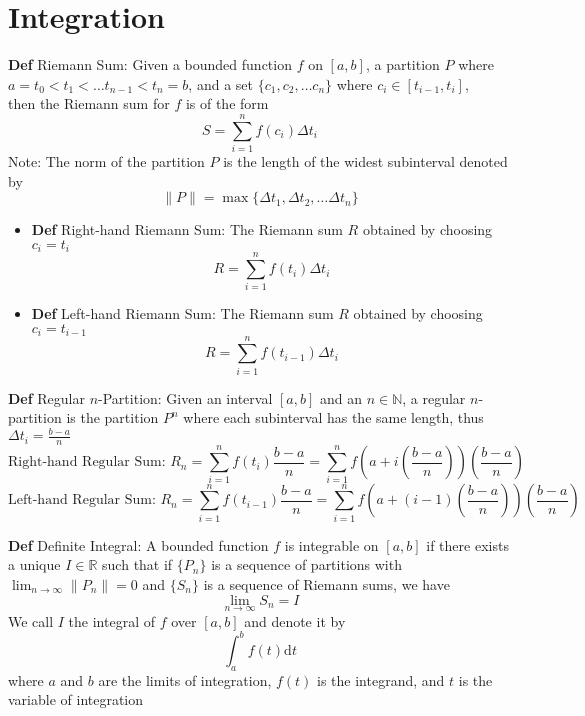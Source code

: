 \documentclass[11pt,notitlepage]{report}
\begin{document}
\newpage
{\small\tableofcontents}
\thispagestyle{empty}

\newpage
\setcounter{page}{1}

\chapter{Integration}

\textbf{Def} Riemann Sum: Given a bounded function $f$ on $[a, b]$, a partition $P$ where \\
$a = t_0 < t_1 < \dots t_{n-1} < t_n = b$, and a set $\{c_1, c_2, \dots c_n\}$ where $c_i \in [t_{i-1}, t_i]$,\\
then the Riemann sum for $f$ is of the form
$$S = \sum_{i=1}^n f(c_i)\Delta t_i$$
\hspace*{5mm} Note: The norm of the partition $P$ is the length of the widest subinterval denoted by $$\lVert P\rVert = \max\{\Delta t_1, \Delta t_2, \dots \Delta t_n\}$$
\begin{itemize}
    \item \textbf{Def} Right-hand Riemann Sum: The Riemann sum $R$ obtained by choosing $c_i = t_i$ 
$$R = \sum_{i=1}^n f(t_i)\Delta t_i$$
    \item \textbf{Def} Left-hand Riemann Sum: The Riemann sum $R$ obtained by choosing $c_i = t_{i-1}$ 
$$R = \sum_{i=1}^n f(t_{i-1})\Delta t_i$$
\end{itemize}

\textbf{Def} Regular $n$-Partition: Given an interval $[a, b]$ and an $n \in \mathbb N$, a regular $n$-partition is the partition $P^n$ where each subinterval has the same length, thus $\Delta t_i = \frac{b-a}{n}$
$$\text{Right-hand Regular Sum: } R_n = \sum_{i=1}^n f(t_i)\frac{b-a}{n} = \sum_{i=1}^n f\left(a+i\left(\frac{b-a}{n}\right)\right)\left(\frac{b-a}{n}\right)$$
$$\text{Left-hand Regular Sum: } R_n = \sum_{i=1}^n f(t_{i-1})\frac{b-a}{n} = \sum_{i=1}^n f\left(a+(i-1)\left(\frac{b-a}{n}\right)\right)\left(\frac{b-a}{n}\right)$$

\newpage
\textbf{Def} Definite Integral: A bounded function $f$ is integrable on $[a, b]$ if there exists a unique $I \in \mathbb R$ such that if $\{P_n\}$ is a sequence of partitions with $\lim_{n \rightarrow \infty} \lVert P_n \rVert = 0$ and $\{S_n\}$ is a sequence of Riemann sums, we have
$$\lim_{n \rightarrow \infty} S_n = I$$
We call $I$ the integral of $f$ over $[a, b]$ and denote it by $$\int_a^b f(t) \mathrm{d}t$$ where $a$ and $b$ are the limits of integration, $f(t)$ is the integrand, and $t$ is the variable of integration
\end{document}
